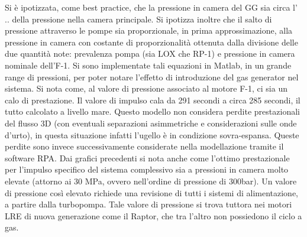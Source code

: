 Si è ipotizzata, come best practice, che la pressione in camera del GG sia circa l' .. della pressione nella camera principale. Si ipotizza inoltre che il salto di pressione attraverso le pompe sia proporzionale, in prima approssimazione, alla pressione in camera con costante di proporzionalità ottenuta dalla divisione delle due quantità note: prevalenza pompa (sia LOX che RP-1) e pressione in camera nominale dell'F-1. \cite{AIAA_book_1}
Si sono implementate tali equazioni in Matlab, in un grande range di pressioni, per poter notare l'effetto di introduzione del gas generator nel sistema. 
Si nota come, al valore di pressione associato al motore F-1, ci sia un calo di prestazione. Il valore di impulso cala da 291 secondi a circa 285 secondi, il tutto calcolato a livello mare. Questo modello non considera perdite prestazionali del flusso 3D (con eventuali separazioni asimmetriche e considerazioni sulle onde d'urto), in questa situazione infatti l'ugello è in condizione sovra-espansa. Queste perdite sono invece successivamente considerate nella modellazione tramite il software RPA. 
Dai grafici precedenti si nota anche come l'ottimo prestazionale per l'impulso specifico del sistema complessivo sia a pressioni in camera molto elevate (attorno ai 30 MPa, ovvero nell'ordine di pressione di 300bar). Un valore di pressione così elevato richiede una revisione di tutti i sistemi di alimentazione, a partire dalla turbopompa. Tale valore di pressione si trova tuttora nei motori LRE di nuova generazione come il Raptor, che tra l'altro non possiedono il ciclo a gas.